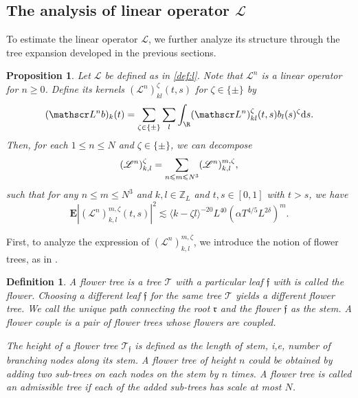 \documentclass[UTF-8,reqno]{amsart}
\numberwithin{equation}{section}
\newtheorem{proposition}[theorem]{Proposition}
\newtheorem{definition}[theorem]{Definition}
\theoremstyle{definition}
\def\dif{{\mathord{{\rm d}}}}
\def\geq{\geqslant}
\def\leq{\leqslant}
\def\dif{{\mathord{{\rm d}}}}
\def\geq{\geqslant}
\def\leq{\leqslant}
\begin{document}
\subsection{The analysis of linear operator $\mathscr{L}$}\label{sec:analysisL}
To estimate the linear operator $\mathscr{L}$, we further analyze its structure through the tree expansion developed in the previous sections.
\begin{proposition} \label{prop-Lm}
Let $\mathscr{ L}$ be defined as in \eqref{def:l}. Note that $\mathscr L^{n}$ is a  linear operator for $n \geq 0$. Define its kernels $(\mathscr L^{n})_{k l}^\zeta(t,s)$ for $\zeta \in \{\pm\}$ by 
\begin{equation*}
(\mathscr L^{n} b)_k (t) = \sum_{\zeta \in \{\pm\}} \sum_{l} \int_{\R} (\mathscr L^{n})_{kl}^{\zeta} (t,s) b_{l}(s)^{\zeta}\dif  s.
\end{equation*}
Then, for each $1 \leq n \leq N$ and $\zeta \in \{\pm\}$, we can decompose
\begin{equation}
(\mathscr L^{n})^\zeta_{k, l} = \sum_{n \leq m \leq N^3} (\mathscr 
L^{n})_{k, l}^{m, \zeta},\notag
\end{equation}
such that for any $n \leq m \leq N^3$ and $k,l \in \mathbb{Z}_L$ and $t,s \in [0,1]$ with $t > s$, we have 
\begin{equation} \label{eq-Lnm}
\mathbf{E} |(\mathscr L^{n})_{k, l}^{m, \zeta}(t,s)|^2 \lesssim \langle k-\zeta l\rangle^{-20}  L^{40} (\alpha  T^{4/5} L^{2\delta})^m.
\end{equation}
    \end{proposition}
First, to analyze the expression of $(\mathscr L^{n})_{k, l}^{m, \zeta}$, we introduce the notion of flower trees, as in \cite[Section 11]{DH23a}.
\begin{definition}\label{def:flowtree}
A flower tree is a tree $\mathcal{T}$ with a   particular  leaf $\mathfrak{f}$  with is  called the  flower. Choosing a different leaf $\mathfrak{f}$ for the same tree $\mathcal{T}$ yields a different flower tree. We call the unique path connecting the root $\mathfrak{r}$ and the flower $\mathfrak{f}$  as the stem. A flower couple is a pair of flower trees whose flowers are coupled.

The  height  of a flower tree $\mathcal{T}_{\mathfrak{f}}$ is defined as the length of stem, i,e, number of branching nodes along its stem. A flower tree of height $n$ could be obtained by adding two sub-trees on each nodes on the stem by $n$ times. A flower tree is called an  admissible  tree if each of the added sub-trees has scale at most $N$.
\end{definition}
\end{document}
